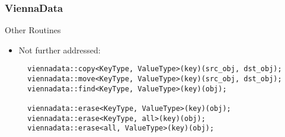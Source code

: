 

\begin{frame}[fragile]
 \frametitle{ViennaData}

 \begin{block}{Other Routines}
  \begin{itemize}
   \item Not further addressed:
 \begin{lstlisting}
  viennadata::copy<KeyType, ValueType>(key)(src_obj, dst_obj);
  viennadata::move<KeyType, ValueType>(key)(src_obj, dst_obj);
  viennadata::find<KeyType, ValueType>(key)(obj);
  
  viennadata::erase<KeyType, ValueType>(key)(obj);
  viennadata::erase<KeyType, all>(key)(obj);  
  viennadata::erase<all, ValueType>(key)(obj);  
 \end{lstlisting}
  \end{itemize}
 \end{block}


\end{frame}

